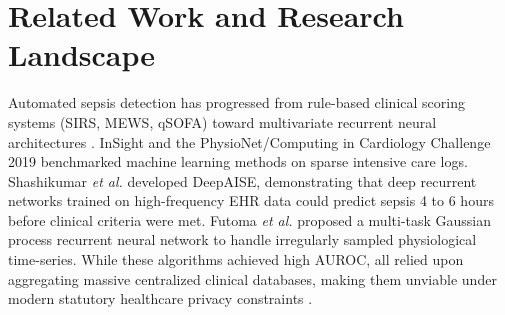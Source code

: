 \documentclass[final,5p,times,twocolumn]{elsarticle}
\begin{document}
\section{Related Work and Research Landscape}
Automated sepsis detection has progressed from rule-based clinical scoring systems (SIRS, MEWS, qSOFA) toward multivariate recurrent neural architectures \cite{singer2016sepsis3,desautels2016prediction}. InSight \cite{desautels2016prediction} and the PhysioNet/Computing in Cardiology Challenge 2019 \cite{reyna2020physionet} benchmarked machine learning methods on sparse intensive care logs. Shashikumar \textit{et al.} \cite{shashikumar2021deepai} developed DeepAISE, demonstrating that deep recurrent networks trained on high-frequency EHR data could predict sepsis 4 to 6 hours before clinical criteria were met. Futoma \textit{et al.} \cite{futoma2017learning} proposed a multi-task Gaussian process recurrent neural network to handle irregularly sampled physiological time-series. While these algorithms achieved high AUROC, all relied upon aggregating massive centralized clinical databases, making them unviable under modern statutory healthcare privacy constraints \cite{kaissis2020trustworthy}.
\end{document}
